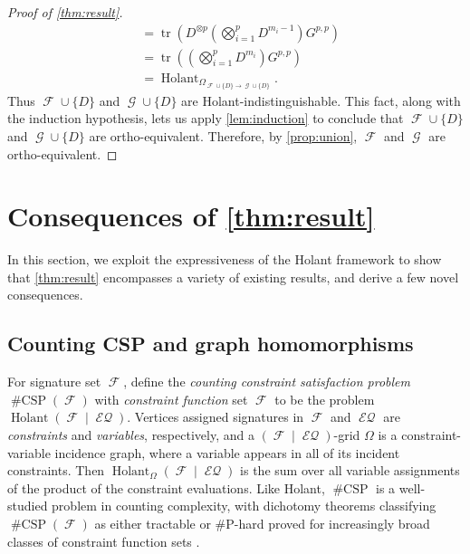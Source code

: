 \documentclass{article}
\theoremstyle{remark}
\theoremstyle{definition}
\DeclareMathOperator{\tr}{tr}
\DeclareMathOperator{\fc}{\mathcal{F}}
\DeclareMathOperator{\gc}{\mathcal{G}}
\DeclareMathOperator{\holant}{Holant}
\DeclareMathOperator{\csp}{\#CSP}
\DeclareMathOperator{\eq}{\mathcal{EQ}}
\begin{document}
\begin{proof}[Proof of \autoref{thm:result}]
\begin{align*}
        &= \tr\left(D^{\otimes p}\left(\bigotimes_{i=1}^p D^{m_i-1}\right) G^{p,p} \right) \\
        &= \tr\left(\left(\bigotimes_{i=1}^p D^{m_i}\right) G^{p,p} \right) \\
        &= \holant_{\Omega_{\fc\cup\{D\}\to\gc\cup\{D\}}}.
    \end{align*}
    Thus $\fc \cup \{D\}$ and $\gc \cup \{D\}$ are Holant-indistinguishable. This fact, along with the
    induction hypothesis, lets us apply \autoref{lem:induction} to conclude that $\fc \cup \{D\}$
    and $\gc \cup \{D\}$ are ortho-equivalent. Therefore, by \autoref{prop:union}, $\fc$ and $\gc$
    are ortho-equivalent.
\end{proof} 
 \section{Consequences of \autoref{thm:result}}
\label{sec:corollaries}
In this section, we exploit the expressiveness of the Holant framework to show that \autoref{thm:result}
encompasses a variety of existing results, and derive a few novel consequences.
\subsection{Counting CSP and graph homomorphisms}
For signature set $\fc$, define the \emph{counting constraint satisfaction problem} $\csp(\fc)$
with \emph{constraint function} set $\fc$
to be the problem $\holant(\fc \mid \eq)$. Vertices assigned signatures in $\fc$ and $\eq$ are 
\emph{constraints} and \emph{variables}, respectively, and a $(\fc\mid\eq)$-grid $\Omega$ is a 
constraint-variable incidence graph, where a variable appears in all of its incident constraints. Then
$\holant_\Omega(\fc\mid\eq)$ is the sum over all variable assignments of the product of the constraint
evaluations.
Like Holant, $\csp$ is a well-studied
problem in counting complexity, with dichotomy theorems classifying $\csp(\fc)$ as either tractable
or \#P-hard proved for increasingly broad classes of constraint function sets 
\cite{bulatov_2013, dyer_richerby, cai-chen-lu, cai-chen-complexity}. 
\end{document}
